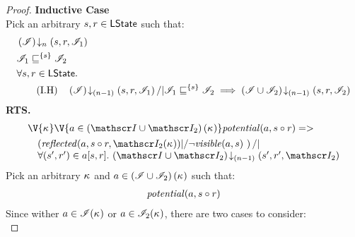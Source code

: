 \begin{lemma}
\begin{proof}
\noindent\textbf{Inductive Case}\\
Pick an arbitrary $s, r \in \textsf{LState}$ such that:
\begin{align}
	&\extendsAMUpto{\lmod}{n}{s}{r}{\lmod_1} \label{LSC:Ass1}\\
	&\lmod_1 \weakenI{\{s\}} \lmod_2 \label{LSC:Ass2}\\
%		
	&	\for{s, r \in \LStates}  \nonumber\\
	& \tag{I.H} 
		\quad \extendsAMUpto{\lmod}{(n-1)}{s}{r}{\lmod_1} /| \lmod_1 \weakenI{\{s\}} \lmod_2 \implies \extendsAMUpto{\lmod \cup \lmod_2}{(n-1)}{s}{r}{\lmod_2} \label{LSC:IH}
\end{align}
%
\textbf{RTS. } 
%
\begin{align}
  &\V{\ca{}}\V{a\in \left(\lmod \cup \lmod_2 \right) (\ca{})}
  \m{potential}(a,s \composeL r) =>\null \nonumber \\
  & \quad
  \begin{array}{@{} l @{}}
		\left(\m{reflected}(a,s \composeL r, \lmod_2(\ca{})) |/ \neg\m{visible}(a,s) \ \right) /| \\
		\for{(s', r') \in a[s, r]} \extendsAMUpto{\lmod \cup \lmod_2}{(n-1)}{s'}{r'}{\lmod_2}
 	\end{array} \label{LSC:Goal3}
\end{align}
%
Pick an arbitrary $\kappa_{}$ and $a \in \left(\mathscr{I} \cup \mathscr{I}_2 \right)(\kappa_{})$ such that:
%
\begin{align}
	\mathit{potential}(a, s \circ r)\label{LSC:Ass8}
\end{align}
%
Since wither $a \in \mathscr{I}(\kappa_{})$ or $a \in \mathscr{I}_2(\kappa_{})$, there are two cases to consider:\\


\end{proof}
\end{lemma}

